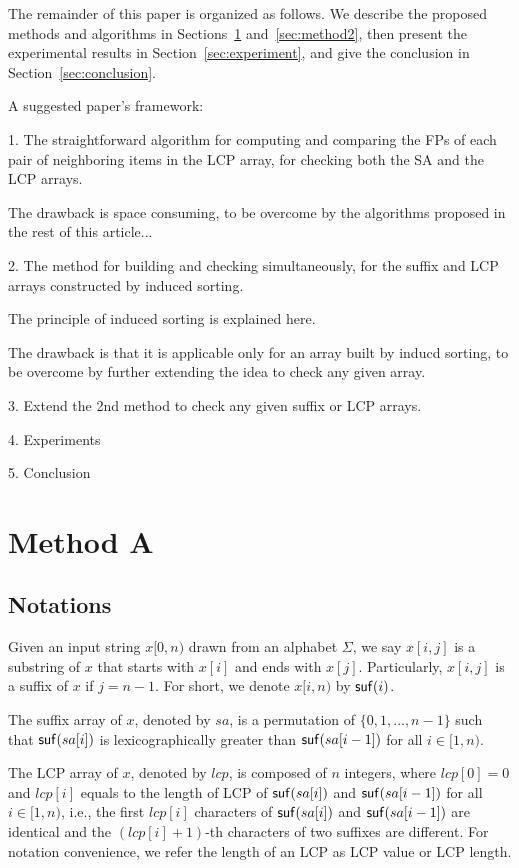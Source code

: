 \documentclass[10pt,journal,compsoc]{IEEEtran}
\begin{document}
The remainder of this paper is organized as follows. We describe the proposed methods and algorithms in Sections~\ref{sec:method1} and~\ref{sec:method2}, then present the experimental results in Section~\ref{sec:experiment}, and give the conclusion in Section~\ref{sec:conclusion}.
	
{\color{red}

A suggested paper's framework:

1. The straightforward algorithm for computing and comparing the FPs of each pair of neighboring items in the LCP array, for checking both the SA and the LCP arrays.

The drawback is space consuming, to be overcome by the algorithms proposed in the rest of this article...

2. The method for building and checking simultaneously, for the suffix and LCP arrays constructed by induced sorting.

The principle of induced sorting is explained here.

The drawback is that it is applicable only for an array built by inducd sorting, to be overcome by further extending the idea to check any given array.

3. Extend the 2nd method to check any given suffix or LCP arrays.

4. Experiments

5. Conclusion
}


	\section{Method A} \label{sec:method1}
	
	\subsection{Notations} \label{sec:method1:notations}
	Given an input string $x[0, n)$ drawn from an alphabet $\Sigma$, we say $x[i, j]$ is a substring of $x$ that starts with $x[i]$ and ends with $x[j]$. Particularly, $x[i, j]$ is a suffix of $x$ if $j = n - 1$. For short, we denote $x[i, n)$ by ${\sf suf}(i)$.
	
	The suffix array of $x$, denoted by $sa$, is a permutation of $\{0, 1, \dots, n - 1\}$ such that ${\sf suf}(sa[i])$ is lexicographically greater than ${\sf suf}(sa[i - 1])$ for all $i \in [1, n)$.
	
	The LCP array of $x$, denoted by $lcp$, is composed of $n$ integers, where $lcp[0] = 0$ and $lcp[i]$ equals to the length of LCP of ${\sf suf}(sa[i])$ and ${\sf suf}(sa[i - 1])$ for all $i \in [1, n)$, i.e., the first $lcp[i]$ characters of ${\sf suf}(sa[i])$ and ${\sf suf}(sa[i - 1])$ are identical and the $(lcp[i]+1)$-th characters of two suffixes are different. For notation convenience, we refer the length of an LCP as LCP value or LCP length.
	
\end{document}
